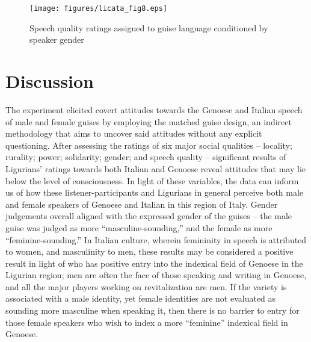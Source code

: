 \documentclass[output=paper,colorlinks,citecolor=brown]{langscibook}
\begin{document}
\begin{figure}
    \texttt{[image: figures/licata\_fig8.eps]}
    \caption{Speech quality ratings assigned to guise language conditioned by speaker gender}
    \label{fig:licata:08}
\end{figure}

\section{Discussion}
The experiment elicited covert attitudes towards the Genoese and Italian speech of male and female guises by employing the matched guise design, an indirect methodology that aims to uncover said attitudes without any explicit questioning. After assessing the ratings of six major social qualities – locality; rurality; power; solidarity; gender; and speech quality – significant results of Ligurians’ ratings towards both Italian and Genoese reveal attitudes that may lie below the level of consciousness. In light of these variables, the data can inform us of how these listener-participants and Ligurians in general perceive both male and female speakers of Genoese and Italian in this region of Italy. Gender judgements overall aligned with the expressed gender of the guises – the male guise was judged as more “masculine-sounding,” and the female as more “feminine-sounding.” In Italian culture, wherein femininity in speech is attributed to women, and masculinity to men, these results may be considered a positive result in light of who has positive entry into the indexical field of Genoese in the Ligurian region; men are often the face of those speaking and writing in Genoese, and all the major players working on revitalization are men. If the variety is associated with a male identity, yet female identities are not evaluated as sounding more masculine when speaking it, then there is no barrier to entry for those female speakers who wish to index a more “feminine” indexical field in Genoese.
\end{document}
